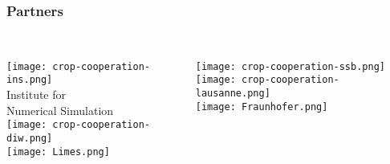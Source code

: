 \begin{frame}\frametitle{Partners}\vspace{1.75cm}

\begin{columns}[t]

\centering \\  \vspace{-1.9cm}
	\texttt{[image: crop-cooperation-ins.png]} \\\vspace{-0.5cm}
	\footnotesize{Institute for \\ Numerical Simulation}\vspace{0.3cm}   \\ \vspace{0.5cm}
	\texttt{[image: crop-cooperation-diw.png]} \\ \vspace{0.95cm}
 	\texttt{[image: Limes.png]}

	\centering \\ \vspace{-1.5cm}
	\texttt{[image: crop-cooperation-ssb.png]} \\ \vspace{0.85cm}
 	\texttt{[image: crop-cooperation-lausanne.png]} \\
 	\vspace{0.85cm}
 	\texttt{[image: Fraunhofer.png]}

\centering \\

\end{columns}

\end{frame}

